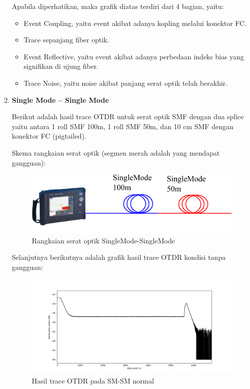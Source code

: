 \documentclass[12pt]{article}
\begin{document}
\begin{enumerate}
		Apabila diperhatikan, maka grafik diatas terdiri dari 4 bagian, yaitu:
		\begin{itemize}
			\item Event Coupling, yaitu event akibat adanya kopling melalui konektor FC.
			\item Trace sepanjang fiber optik.
			\item Event Reflective, yaitu event akibat adanya perbedaan indeks bias yang signifikan di ujung fiber.
			\item Trace Noise, yaitu noise akibat panjang serat optik telah berakhir.
		\end{itemize}
		
		\newpage
		\item \textbf{Single Mode – Single Mode}
		
		Berikut adalah hasil trace OTDR untuk serat optik SMF dengan dua splice yaitu antara 1 roll SMF 100m, 1 roll SMF 50m, dan 10 cm SMF dengan konektor FC (pigtailed).
		
		Skema rangkaian serat optik (segmen merah adalah yang mendapat gangguan):
		
		\begin{figure}[!ht]
			\centering
			\captionsetup{justification=centering}
			\includegraphics[width=0.6\linewidth]{images/Bab_4/sm}
			\caption[Trace SMF-SMF]{\small{Rangkaian serat optik SingleMode-SingleMode}}
		\end{figure}
	
		Selanjutnya berikutnya adalah grafik hasil trace OTDR kondisi tanpa gangguan:
		
		\begin{figure}[!ht]
			\centering
			\captionsetup{justification=centering}
			\includegraphics[width=\linewidth]{images/Bab_4/Bab_4_3b1}
			\caption[Trace SMF-SMF]{\small{Hasil trace OTDR pada SM-SM normal}}
		\end{figure}
	

\end{enumerate}
\end{document}
